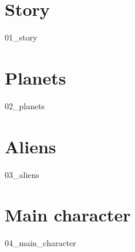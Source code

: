 \chapter{Story}
{01_story}

\chapter{Planets}
{02_planets}

\chapter{Aliens}
{03_aliens}

\chapter{Main character}
{04_main_character}